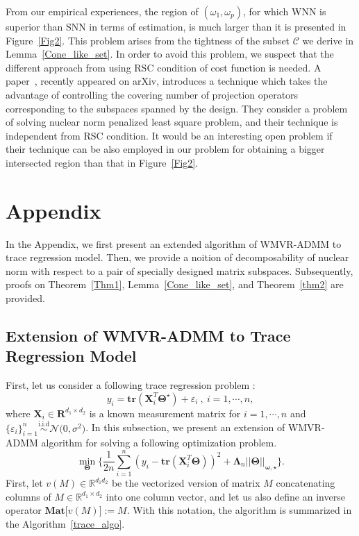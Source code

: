 \documentclass[12pt]{article}
\begin{document}
From our empirical experiences, the region of $(\omega_{1},\omega_{p})$, for which WNN is superior than SNN in terms of estimation, is much larger than it is presented in Figure~\ref{Fig2}.
This problem arises from the tightness of the subset $\mathcal{C}$ we derive in Lemma~\ref{Cone_like_set}.
In order to avoid this problem, we suspect that the different approach from using RSC condition of cost function is needed.
A paper~\citet{law2021rank}, recently appeared on arXiv, introduces a technique which takes the advantage of controlling the covering number of projection operators corresponding to the subspaces spanned by the design.
They consider a problem of solving nuclear norm penalized least square problem, and their technique is independent from RSC condition.  
It would be an interesting open problem if their technique can be also employed in our problem for obtaining a bigger intersected region than that in Figure~\ref{Fig2}.

\section{Appendix}
In the Appendix, we first present an extended algorithm of WMVR-ADMM to trace regression model.
Then, we provide a noition of decomposability of nuclear norm with respect to a pair of specially designed matrix subspaces.
Subsequently, proofs on Theorem~\ref{Thm1}, Lemma~\ref{Cone_like_set}, and Theorem~\ref{thm2} are provided.

\subsection{Extension of WMVR-ADMM to Trace Regression Model} \label{tr_algo}
First, let us consider a following trace regression problem :
\begin{equation*}
    y_{i} = \textbf{tr}(\boldsymbol{X}^{T}_{i}\boldsymbol{\Theta^\star}) + \varepsilon_{i} \ ,\ i = 1, \cdots, n, \label{eq: TR}
\end{equation*}
where $\boldsymbol{X}_{i} \in \boldsymbol{R}^{d_{1} \times d_{2}}$ is a known measurement matrix for $i = 1, \cdots, n$ and $\big\{\varepsilon_{i}\big\}_{i=1}^{n}\stackrel{\text{i.i.d}}{\sim} \mathcal{N}\big( 0, \sigma^{2} \big)$. 
In this subsection, we present an extension of WMVR-ADMM algorithm for solving a following optimization problem.
\begin{equation*}
    \min_{\boldsymbol{\Theta}} \Bigg\{ \frac{1}{2n}\sum^{n}_{i=1} (y_{i} - \textbf{tr}(\boldsymbol{X}^{T}_{i}\boldsymbol{\Theta}))^2 + \boldsymbol{\Lambda}_{n} ||\boldsymbol{\Theta}||_{\boldsymbol{\omega,\star}} \Bigg\}. \label{eq: opt}
\end{equation*}
First, let $v(M)\in\mathbb{R}^{d_{1}d_{2}}$ be the vectorized version of matrix $M$ concatenating columns of $M\in\mathbb{R}^{d_{1} \times d_{2}}$ into one column vector, and let us also define an inverse operator $\textbf{Mat} \big[ v(M) \big] := M$.
With this notation, the algorithm is summarized in the Algorithm~\ref{trace_algo}.
\end{document}
